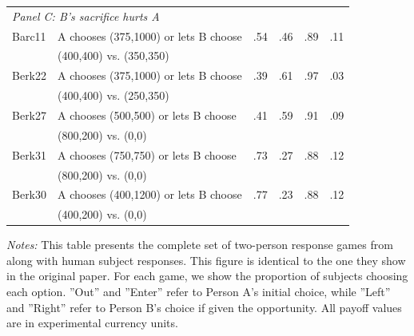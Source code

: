 \begin{table}[h!]
\begin{center}
\begin{tabular}{llcccc}
\multicolumn{6}{l}{\textit{Panel C: B's sacrifice hurts A}} \\[0.5ex]
Barc11 & A chooses (375,1000) or lets B choose & .54 & .46 & .89 & .11 \\
& (400,400) vs. (350,350) & & & & \\
Berk22 & A chooses (375,1000) or lets B choose & .39 & .61 & .97 & .03 \\
& (400,400) vs. (250,350) & & & & \\
Berk27 & A chooses (500,500) or lets B choose & .41 & .59 & .91 & .09 \\
& (800,200) vs. (0,0) & & & & \\
Berk31 & A chooses (750,750) or lets B choose & .73 & .27 & .88 & .12 \\
& (800,200) vs. (0,0) & & & & \\
Berk30 & A chooses (400,1200) or lets B choose & .77 & .23 & .88 & .12 \\
& (400,200) vs. (0,0) & & & & \\
\hline
\end{tabular}
\end{center}
\begin{footnotesize}
\begin{singlespace}
\vspace*{-0.05in}
\textit{Notes:} This table presents the complete set of two-person response games from \citeauthor{charness2002understanding} along with human subject responses. 
This figure is identical to the one they show in the original paper.
For each game, we show the proportion of subjects choosing each option. ''Out'' and ''Enter'' refer to Person A's initial choice, while ''Left'' and ''Right'' refer to Person B's choice if given the opportunity. All payoff values are in experimental currency units.
\end{singlespace}
\end{footnotesize}
\end{table}
  
\newpage \clearpage

\renewcommand{\thefigure}{B\arabic{figure}} 
\setcounter{figure}{0}  

\renewcommand{\thetable}{B\arabic{table}} 
\setcounter{table}{0}  

